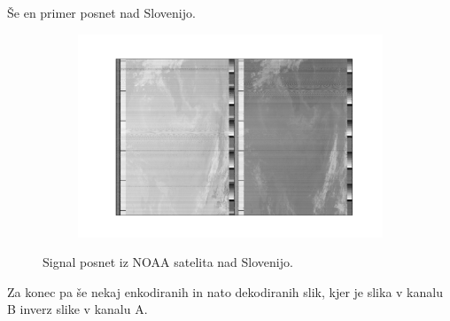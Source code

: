 \documentclass{article}
\begin{document}
Še en primer posnet nad Slovenijo.
\begin{figure}[H]
    \centering
    \begin{subfigure}[b]{0.49\textwidth}
        \centering
        \includegraphics[width=\textwidth]{slovenia.pdf}
    \end{subfigure}
	\caption{Signal posnet iz NOAA satelita nad Slovenijo.}
    \label{fig:out_example0}
\end{figure}
Za konec pa še nekaj enkodiranih in nato dekodiranih slik, kjer je slika v kanalu B inverz slike v kanalu A. 
\end{document}
